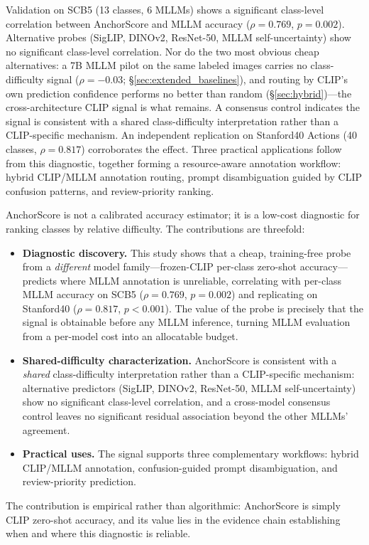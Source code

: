 \documentclass[a4paper,fleqn]{cas-sc}
\begin{document}
Validation on SCB5 (13 classes, 6 MLLMs) shows a significant class-level correlation between AnchorScore and MLLM accuracy ($\rho=0.769$, $p=0.002$). Alternative probes (SigLIP, DINOv2, ResNet-50, MLLM self-uncertainty) show no significant class-level correlation. Nor do the two most obvious cheap alternatives: a 7B MLLM pilot on the same labeled images carries no class-difficulty signal ($\rho=-0.03$; \S\ref{sec:extended_baselines}), and routing by CLIP's own prediction confidence performs no better than random (\S\ref{sec:hybrid})---the cross-architecture CLIP signal is what remains. A consensus control indicates the signal is consistent with a shared class-difficulty interpretation rather than a CLIP-specific mechanism. An independent replication on Stanford40 Actions (40 classes, $\rho=0.817$) corroborates the effect. Three practical applications follow from this diagnostic, together forming a resource-aware annotation workflow: hybrid CLIP/MLLM annotation routing, prompt disambiguation guided by CLIP confusion patterns, and review-priority ranking.

AnchorScore is not a calibrated accuracy estimator; it is a low-cost diagnostic for ranking classes by relative difficulty. The contributions are threefold:
\begin{itemize}
\item \textbf{Diagnostic discovery.} This study shows that a cheap, training-free probe from a \emph{different} model family---frozen-CLIP per-class zero-shot accuracy---predicts where MLLM annotation is unreliable, correlating with per-class MLLM accuracy on SCB5 ($\rho=0.769$, $p=0.002$) and replicating on Stanford40 ($\rho=0.817$, $p<0.001$). The value of the probe is precisely that the signal is obtainable before any MLLM inference, turning MLLM evaluation from a per-model cost into an allocatable budget.
\item \textbf{Shared-difficulty characterization.} AnchorScore is consistent with a \emph{shared} class-difficulty interpretation rather than a CLIP-specific mechanism: alternative predictors (SigLIP, DINOv2, ResNet-50, MLLM self-uncertainty) show no significant class-level correlation, and a cross-model consensus control leaves no significant residual association beyond the other MLLMs' agreement.
\item \textbf{Practical uses.} The signal supports three complementary workflows: hybrid CLIP/MLLM annotation, confusion-guided prompt disambiguation, and review-priority prediction.
\end{itemize}
The contribution is empirical rather than algorithmic: AnchorScore is simply CLIP zero-shot accuracy, and its value lies in the evidence chain establishing when and where this diagnostic is reliable.
\end{document}
